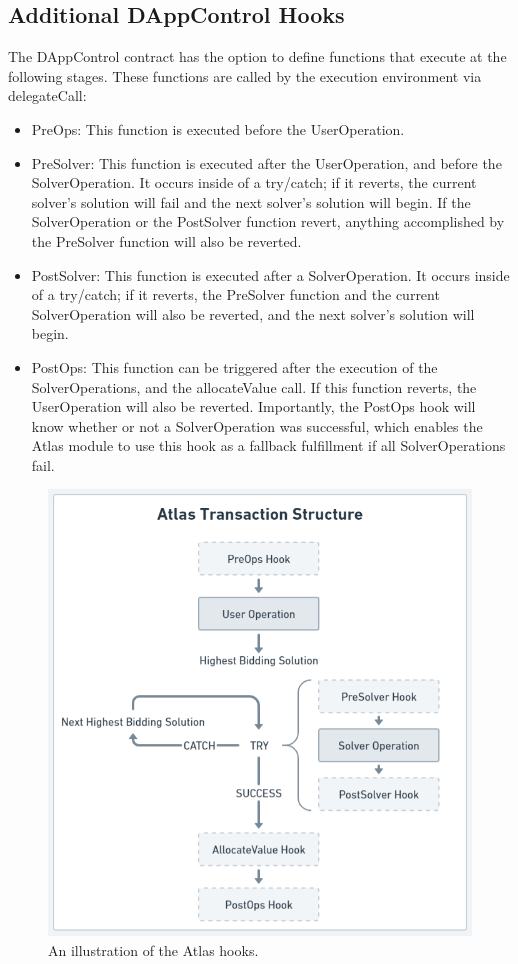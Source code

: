 \documentclass{article}
\begin{document}
\subsection{Additional DAppControl Hooks}
The DAppControl contract has the option to define functions that execute at the following stages. These functions are called by the execution environment via delegateCall:
\begin{itemize}
\item PreOps: This function is executed before the UserOperation.
\item PreSolver: This function is executed after the UserOperation, and before the SolverOperation. It occurs inside of a try/catch; if it reverts, the current solver's solution will fail and the next solver's solution will begin. If the SolverOperation or the PostSolver function revert, anything accomplished by the PreSolver function will also be reverted.
\item PostSolver: This function is executed after a SolverOperation. It occurs inside of a try/catch; if it reverts, the PreSolver function and the current SolverOperation will also be reverted, and the next solver's solution will begin.
\item PostOps: This function can be triggered after the execution of the SolverOperations, and the allocateValue call. If this function reverts, the UserOperation will also be reverted. Importantly, the PostOps hook will know whether or not a SolverOperation was successful, which enables the Atlas module to use this hook as a fallback fulfillment if all SolverOperations fail. 
\end{itemize}

\begin{figure}[H]
\centering
\includegraphics[width=.8\linewidth]{BlackAndWhiteCallStructure.png}
\caption{\label{fig:BlackAndWhiteCallStructure.png}An illustration of the Atlas hooks.}
\end{figure}
\end{document}
